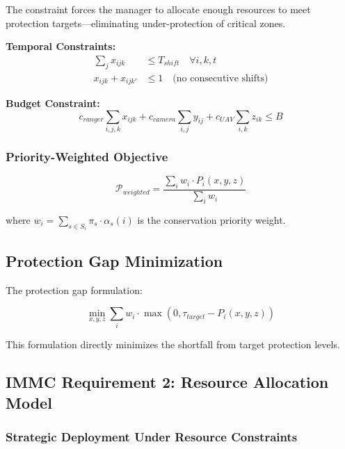 The constraint forces the manager to allocate enough resources to meet protection targets—eliminating under-protection of critical zones.

\noindent \textbf{Temporal Constraints:}
\begin{align}
\sum_{j} x_{ijk} &\leq T_{shift} \quad \forall i, k, t \label{eq:shift_limit} \\
x_{ijk} + x_{ijk'} &\leq 1 \quad \text{(no consecutive shifts)}
\end{align}

\noindent \textbf{Budget Constraint:}
\begin{equation}
c_{ranger} \sum_{i,j,k} x_{ijk} + c_{camera} \sum_{i,j} y_{ij} + c_{UAV} \sum_{i,k} z_{ik} \leq B
\label{eq:budget}
\end{equation}

\subsubsection{Priority-Weighted Objective}

\begin{equation}
\mathcal{P}_{weighted} = \frac{\sum_{i} w_i \cdot P_i(x, y, z)}{\sum_{i} w_i}
\label{eq:weighted_protection}
\end{equation}

where $w_i = \sum_{s \in S_i} \pi_s \cdot \alpha_s(i)$ is the conservation priority weight.

\subsection{Protection Gap Minimization}

The protection gap formulation:

\begin{equation}
\min_{x, y, z} \sum_{i} w_i \cdot \max(0, \tau_{target} - P_i(x, y, z))
\label{eq:gap_minimization}
\end{equation}

This formulation directly minimizes the shortfall from target protection levels.

\subsection*{IMMC Requirement 2: Resource Allocation Model}

\subsubsection{Strategic Deployment Under Resource Constraints}

